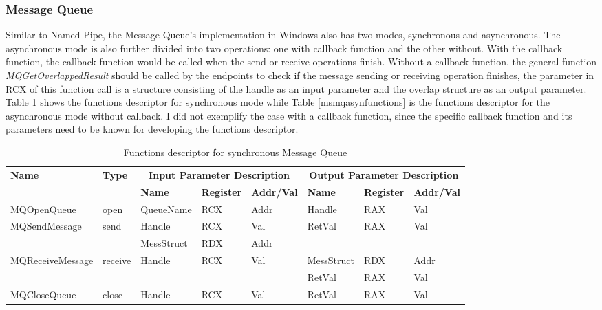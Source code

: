 \subsubsection{Message Queue}
Similar to Named Pipe, the Message Queue's implementation in Windows also has two modes, synchronous and asynchronous. The asynchronous mode is also further divided into two operations: one with callback function and the other without. With the callback function, the callback function would be called when the send or receive operations finish. Without a callback function, the general function \textit{MQGetOverlappedResult} should be called by the endpoints to check if the message sending or receiving operation finishes, the parameter in RCX of this function call is a structure consisting of the handle as an input parameter and the overlap structure as an output parameter. Table \ref{msmqsynfunctions} shows the functions descriptor for synchronous mode while Table \ref{msmqasynfunctions} is the functions descriptor for the asynchronous mode without callback. I did not exemplify the case with a callback function, since the specific callback function and its parameters need to be known for developing the functions descriptor.

\begin{table}[H]
  \centering
  \caption{Functions descriptor for synchronous Message Queue}
  \label{msmqsynfunctions}
\begin{tabular}{|l|l|l|l|l|l|l|l|}
\hline
             \multirow{2}{*}{{\textbf{Name}}} & \multirow{2}{*}{{\textbf{Type}}} & \multicolumn{3}{c|}{\textbf{Input Parameter Description}} & \multicolumn{3}{c|}{\textbf{Output Parameter Description}} \\
              \cline{3-8} 
             & & \textbf{Name}& \textbf{Register} & \textbf{Addr/Val} & \textbf{Name}& \textbf{Register} &  \textbf{Addr/Val}  \\
             \hline
      MQOpenQueue
       &open & QueueName & RCX  & Addr &  Handle & RAX & Val\\
      \hline                     
      \multirow{2}{*}{MQSendMessage}
       &\multirow{2}{*}{send} &  Handle & RCX & Val & \multirow{2}{*}{RetVal} & \multirow{2}{*}{RAX}  & \multirow{2}{*}{Val} \\
       \cline{3-5}
      & & MessStruct& RDX&Addr &   &  &  \\
      \hline            
      \multirow{2}{*}{MQReceiveMessage}
       &\multirow{2}{*}{receive}&  \multirow{2}{*}{Handle} & \multirow{2}{*}{RCX} & \multirow{2}{*}{Val}& MessStruct& RDX&Addr\\
              \cline{6-8}
      & & & & & RetVal & RAX & Val\\
      \hline       
      MQCloseQueue &
       close &  Handle & RCX & Val & RetVal & RAX & Val\\
      \hline                          
  \end{tabular}   
\end{table}

